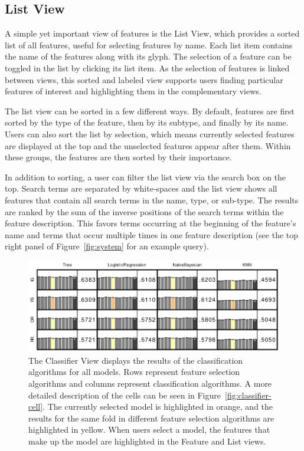 \subsection{List View}
A simple yet important view of features is the List View, which provides a sorted list of all features, useful for selecting features by name.  Each list item contains the name of the features along with its glyph.  The selection of a feature can be toggled in the list by clicking its list item.  As the selection of features is linked between views, this sorted and labeled view supports users finding particular features of interest and highlighting them in the complementary views.

The list view can be sorted in a few different ways. By default, features are first sorted by
the type of the feature, then by its subtype, and finally by its name.  Users can also sort the list by selection, which means currently selected features are displayed at the top and the unselected features appear after them.  Within these groups, the features are then sorted by their importance.

In addition to sorting, a user can filter the list view via the search box on
the top.
Search terms are separated by white-spaces and the list view
shows all features that contain all search terms in the name, type, or
sub-type.
The results are ranked by the sum of the inverse positions
of the search terms within the feature description.
This favors terms occurring at the beginning of the feature's name
and terms that occur multiple times in one feature description
(see the top right panel of Figure~\ref{fig:system} for an example query).

\begin{figure}[t]
\centering
\includegraphics[width=0.8\linewidth]{infuse/classifier}
\caption{The Classifier View displays the results of the classification algorithms for all models.
Rows represent feature selection algorithms and columns represent classification algorithms.
A more detailed description of the cells can be
seen in Figure~\ref{fig:classifier-cell}.
The currently selected model is highlighted in orange, and the results for the same fold in different
feature selection algorithms are highlighted in yellow.  When users select a model, the features that make up the model are highlighted in the Feature and List views.
}
\label{fig:classifier}
\end{figure}

